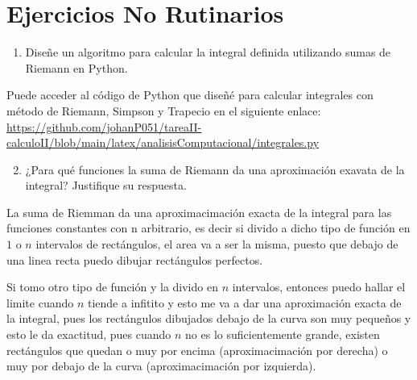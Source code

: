 \section{Ejercicios No Rutinarios}

\begin{enumerate}
    \item Diseñe un algoritmo para calcular la integral definida utilizando sumas de Riemann en Python.
\end{enumerate}

Puede acceder al código de Python que diseñé para calcular integrales con método de Riemann, Simpson y Trapecio en el siguiente enlace: \url{https://github.com/johanP051/tareaII-calculoII/blob/main/latex/analisisComputacional/integrales.py}

\begin{enumerate}
    \setcounter{enumi}{1}
    \item ¿Para qué funciones la suma de Riemann da una aproximación exavata de la integral? Justifique su respuesta.
\end{enumerate}

La suma de Riemman da una aproximacimación exacta de la integral para las
funciones constantes con n arbitrario, es decir si divido a dicho tipo de
función en $1$ o $n$ intervalos de rectángulos, el area va a ser la misma,
puesto que debajo de una linea recta puedo dibujar rectángulos perfectos.

Si tomo otro tipo de función y la divido en $n$ intervalos, entonces puedo hallar
el limite cuando $n$ tiende a infitito y esto me va a dar una aproximación exacta
de la integral, pues los rectángulos dibujados debajo de la curva son muy pequeños
y esto le da exactitud, pues cuando $n$ no es lo suficientemente grande, existen
rectángulos que quedan o muy por encima (aproximacimación por derecha) o muy por debajo de la curva (aproximacimación por izquierda).